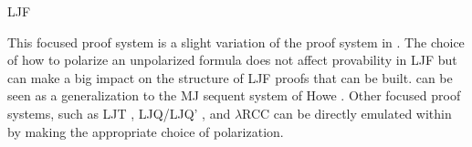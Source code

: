 \begin{entry}{LJF}
\begin{history}
This focused proof system is a slight variation of the proof system in
\cite{liang09tcs,liang07csl}.  The choice of how to polarize an
unpolarized formula does not affect provability in LJF but can make a
big impact on the structure of LJF proofs that can be built.  
\LJF can be seen as a generalization to the MJ sequent system of Howe
\cite{howe98phd}. 
Other focused proof systems, such as LJT \cite{herbelin95phd},
LJQ/LJQ' \cite{dyckhoff06cie}, and $\lambda$RCC
\cite{jagadeesan05fsttcs} can be directly emulated within \LJF by
making the appropriate choice of polarization.
\end{history}











\end{entry}
